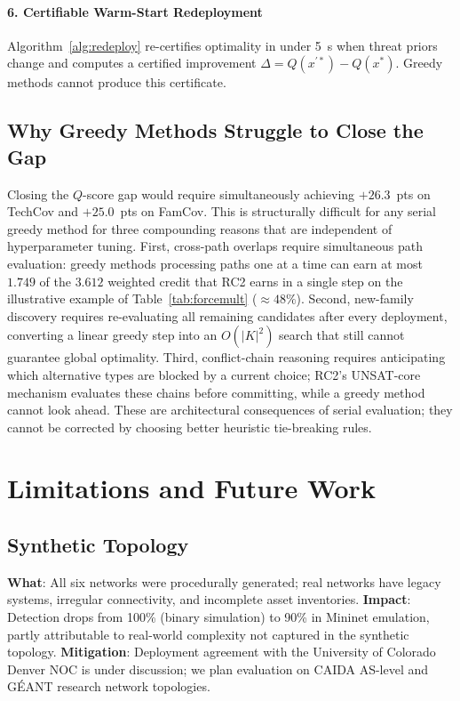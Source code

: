 \documentclass[journal]{IEEEtran}
\newcommand{\qscore}{$Q$-score}
\begin{document}
\paragraph{6. Certifiable Warm-Start Redeployment}
Algorithm~\ref{alg:redeploy} re-certifies optimality in under 5~s
when threat priors change and computes a certified improvement
$\Delta=Q(x^{\prime*})-Q(x^*)$. Greedy methods cannot produce this
certificate.

\subsection{Why Greedy Methods Struggle to Close the Gap}
Closing the \qscore{} gap would require simultaneously achieving
$+26.3$~pts on TechCov and $+25.0$~pts on FamCov. This is
structurally difficult for any serial greedy method for three
compounding reasons that are independent of hyperparameter tuning.
First, cross-path overlaps require simultaneous path evaluation:
greedy methods processing paths one at a time can earn at most
$1.749$ of the $3.612$ weighted credit that RC2 earns in a single
step on the illustrative example of Table~\ref{tab:forcemult}
(${\approx}48\%$). Second, new-family discovery requires
re-evaluating all remaining candidates after every deployment,
converting a linear greedy step into an $O(|K|^2)$ search that still
cannot guarantee global optimality. Third, conflict-chain reasoning
requires anticipating which alternative types are blocked by a
current choice; RC2's UNSAT-core mechanism evaluates these chains
before committing, while a greedy method cannot look ahead.
These are architectural consequences of serial evaluation; they
cannot be corrected by choosing better heuristic tie-breaking rules.

\FloatBarrier
\section{Limitations and Future Work}
\label{sec:limitations}

\subsection{Synthetic Topology}
\label{sec:limitations:topology}
\textbf{What}: All six networks were procedurally generated; real
networks have legacy systems, irregular connectivity, and incomplete
asset inventories.
\textbf{Impact}: Detection drops from 100\% (binary simulation) to
90\% in Mininet emulation, partly attributable to real-world
complexity not captured in the synthetic topology.
\textbf{Mitigation}: Deployment agreement with the University of
Colorado Denver NOC is under discussion; we plan evaluation on
CAIDA AS-level and G\'EANT research network topologies.
\end{document}
